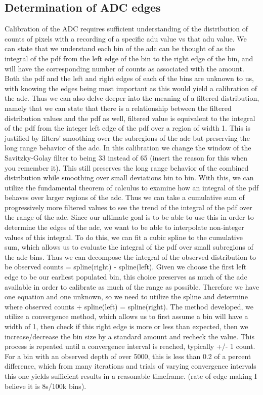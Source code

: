 \documentclass[11pt, letterpaper]{article}
\begin{document}
\subsection{Determination of ADC edges}
Calibration of the ADC requires sufficient understanding of the distribution of counts of pixels with a recording of a specific adu value vs that adu value. We can state that we understand each bin of the adc can be thought of as the integral of the pdf from the left edge of the bin to the right edge of the bin, and will have the corresponding number of counts as associated with the amount. Both the pdf and the left and right edges of each of the bins are unknown to us, with knowing the edges being most important as this would yield a calibration of the adc. Thus we can also delve deeper into the meaning of a filtered distribution, namely that we can state that there is a relationship between the filtered distribution values and the pdf as well, filtered value is equivalent to the integral of the pdf from the integer left edge of the pdf over a region of width 1. This is justified by filters’ smoothing over the subregions of the adc but preserving the long range behavior of the adc. In this calibration we change the window of the Savitzky-Golay filter to being 33 instead of 65 (insert the reason for this when you remember it). This still preserves the long range behavior of the combined distribution while smoothing over small deviations bin to bin. With this, we can utilize the fundamental theorem of calculus to examine how an integral of the pdf behaves over larger regions of the adc. Thus we can take a cumulative sum of progressively more filtered values to see the trend of the integral of the pdf over the range of the adc. Since our ultimate goal is to be able to use this in order to determine the edges of the adc, we want to be able to interpolate non-integer values of this integral. To do this, we can fit a cubic spline to the cumulative sum, which allows us to evaluate the integral of the pdf over small subregions of the adc bins. Thus we can decompose the integral of the observed distribution to be observed counts = spline(right) - spline(left). Given we choose the first left edge to be our earliest populated bin, this choice preserves as much of the adc available in order to calibrate as much of the range as possible. Therefore we have one equation and one unknown, so we need to utilize the spline and determine where observed counts + spline(left) = spline(right). 
The method developed, we utilize a convergence method, which allows us to first assume a bin will have a width of 1, then check if this right edge is more or less than expected, then we increase/decrease the bin size by a standard amount and recheck the value. This process is repeated until a convergence interval is reached, typically +/- 1 count. For a bin with an observed depth of over 5000, this is less than 0.2 of a percent difference, which from many iterations and trials of varying convergence intervals this one yields sufficient results in a reasonable timeframe. (rate of edge making I believe it is 8s/100k bins). 
\end{document}
